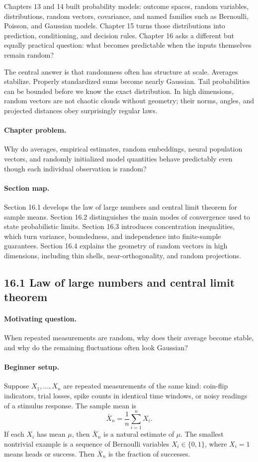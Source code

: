 Chapters 13 and 14 built probability models: outcome spaces, random variables, distributions, random vectors, covariance, and named families such as Bernoulli, Poisson, and Gaussian models. Chapter 15 turns those distributions into prediction, conditioning, and decision rules. Chapter 16 asks a different but equally practical question: what becomes predictable when the inputs themselves remain random?

The central answer is that randomness often has structure at scale. Averages stabilize. Properly standardized sums become nearly Gaussian. Tail probabilities can be bounded before we know the exact distribution. In high dimensions, random vectors are not chaotic clouds without geometry; their norms, angles, and projected distances obey surprisingly regular laws.

\paragraph{Chapter problem.}
Why do averages, empirical estimates, random embeddings, neural population vectors, and randomly initialized model quantities behave predictably even though each individual observation is random?

\paragraph{Section map.}
Section 16.1 develops the law of large numbers and central limit theorem for sample means. Section 16.2 distinguishes the main modes of convergence used to state probabilistic limits. Section 16.3 introduces concentration inequalities, which turn variance, boundedness, and independence into finite-sample guarantees. Section 16.4 explains the geometry of random vectors in high dimensions, including thin shells, near-orthogonality, and random projections.

\subsection{16.1 Law of large numbers and central limit theorem}

\paragraph{Motivating question.}
When repeated measurements are random, why does their average become stable, and why do the remaining fluctuations often look Gaussian?

\paragraph{Beginner setup.}
Suppose \(X_1,\ldots,X_n\) are repeated measurements of the same kind: coin-flip indicators, trial losses, spike counts in identical time windows, or noisy readings of a stimulus response. The sample mean is
\[
\bar X_n=\frac{1}{n}\sum_{i=1}^n X_i.
\]
If each \(X_i\) has mean \(\mu\), then \(\bar X_n\) is a natural estimate of \(\mu\). The smallest nontrivial example is a sequence of Bernoulli variables \(X_i\in\{0,1\}\), where \(X_i=1\) means heads or success. Then \(\bar X_n\) is the fraction of successes.

